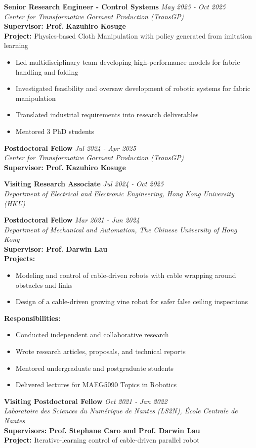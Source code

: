 \documentclass[11pt,a4paper]{article}
\newcommand{\cvitem}[4]{
  \textbf{#1} \hfill \textit{#2}\\
  \textit{#3}\\
  #4
  \vspace{0.3cm}
}
\newcommand{\cvitemdetailed}[5]{
  \textbf{#1} \hfill \textit{#2}\\
  \textit{#3}\\
  \textbf{#4}\\
  #5
  \vspace{0.3cm}
}
\begin{document}
\cvitemdetailed{Senior Research Engineer - Control Systems}{May 2025 - Oct 2025}{Center for Transformative Garment Production (TransGP)}{Supervisor: Prof. Kazuhiro Kosuge}{
\textbf{Project:} Physics-based Cloth Manipulation with policy generated from imitation learning
\begin{itemize}[nosep,leftmargin=*]
  \item Led multidisciplinary team developing high-performance models for fabric handling and folding
  \item Investigated feasibility and oversaw development of robotic systems for fabric manipulation
  \item Translated industrial requirements into research deliverables
  \item Mentored 3 PhD students
\end{itemize}
}

\cvitemdetailed{Postdoctoral Fellow}{Jul 2024 - Apr 2025}{Center for Transformative Garment Production (TransGP)}{Supervisor: Prof. Kazuhiro Kosuge}{}

\cvitem{Visiting Research Associate}{Jul 2024 - Oct 2025}{Department of Electrical and Electronic Engineering, Hong Kong University (HKU)}{}

\newpage

\cvitemdetailed{Postdoctoral Fellow}{Mar 2021 - Jun 2024}{Department of Mechanical and Automation, The Chinese University of Hong Kong}{Supervisor: Prof. Darwin Lau}{
\textbf{Projects:}
\begin{itemize}[nosep,leftmargin=*]
  \item Modeling and control of cable-driven robots with cable wrapping around obstacles and links
  \item Design of a cable-driven growing vine robot for safer false ceiling inspections
\end{itemize}
\textbf{Responsibilities:}
\begin{itemize}[nosep,leftmargin=*]
  \item Conducted independent and collaborative research
  \item Wrote research articles, proposals, and technical reports
  \item Mentored undergraduate and postgraduate students
  \item Delivered lectures for MAEG5090 Topics in Robotics
\end{itemize}
}

\cvitemdetailed{Visiting Postdoctoral Fellow}{Oct 2021 - Jan 2022}{Laboratoire des Sciences du Numérique de Nantes (LS2N), École Centrale de Nantes}{Supervisors: Prof. Stephane Caro and Prof. Darwin Lau}{
\textbf{Project:} Iterative-learning control of cable-driven parallel robot
}
\end{document}
